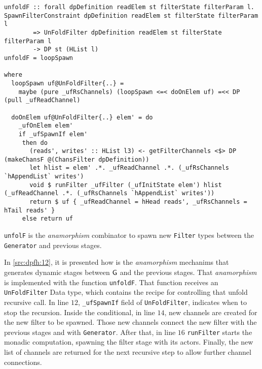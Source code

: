 \begin{listing}[H]
  \begin{verbatim}
unfoldF :: forall dpDefinition readElem st filterState filterParam l. SpawnFilterConstraint dpDefinition readElem st filterState filterParam l
        => UnFoldFilter dpDefinition readElem st filterState filterParam l 
        -> DP st (HList l) 
unfoldF = loopSpawn

where
  loopSpawn uf@UnFoldFilter{..} =
    maybe (pure _ufRsChannels) (loopSpawn <=< doOnElem uf) =<< DP (pull _ufReadChannel)

  doOnElem uf@UnFoldFilter{..} elem' = do
    _ufOnElem elem'
    if _ufSpawnIf elem'
     then do
       (reads', writes' :: HList l3) <- getFilterChannels <$> DP (makeChansF @(ChansFilter dpDefinition))
       let hlist = elem' .*. _ufReadChannel .*. (_ufRsChannels `hAppendList` writes')
       void $ runFilter _ufFilter (_ufInitState elem') hlist (_ufReadChannel .*. (_ufRsChannels `hAppendList` writes'))
       return $ uf { _ufReadChannel = hHead reads', _ufRsChannels = hTail reads' }
     else return uf

  \end{verbatim}
  \caption[{[\texttt{Stage.hs}] unfoldF}]{\texttt{unfolF} is the \emph{anamorphism} combinator to spawn new \texttt{Filter} types between the \texttt{Generator} and previous stages.}
  \label{src:dpfh:12}
\end{listing}

In \autoref{src:dpfh:12}, it is presented how is the \emph{anamorphism} mechanims that generates dynamic stages between $\mathsf{G}$ and the previous stages.
That \emph{anamorphism} is implemented with the function \texttt{unfoldF}. That function receives an \texttt{UnFoldFilter} Data type, which contains the recipe for controlling that unfold recursive call. 
In line $12$, \texttt{_ufSpawnIf} field of \texttt{UnFoldFilter}, indicates when to stop the recursion. 
Inside the conditional, in line $14$, new channels are created for the new filter to be spawned. Those new channels connect the new filter with the previous stages and with \texttt{Generator}. 
After that, in line $16$ \texttt{runFilter} starts the monadic computation, spawning the filter stage with its actors.
Finally, the new list of channels are returned for the next recursive step to allow further channel connections.

